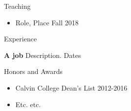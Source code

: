 \documentclass{resume} %
\begin{document}

\begin{rSection}{Teaching}
	\begin{itemize}[itemsep = -5pt, leftmargin=*]
		\item Role, Place \hfill{Fall 2018}
	\end{itemize}
\end{rSection}


\begin{rSection}{Experience}

{\bf A job} Description. \hfill{Dates}

\end{rSection}


\begin{rSection}{Honors and Awards}
	\begin{itemize}[itemsep = -5pt, leftmargin=*]
		\item Calvin College Dean’s List \hfill{2012-2016}
        \item Etc. etc.
	\end{itemize}
\end{rSection}
\end{document}
